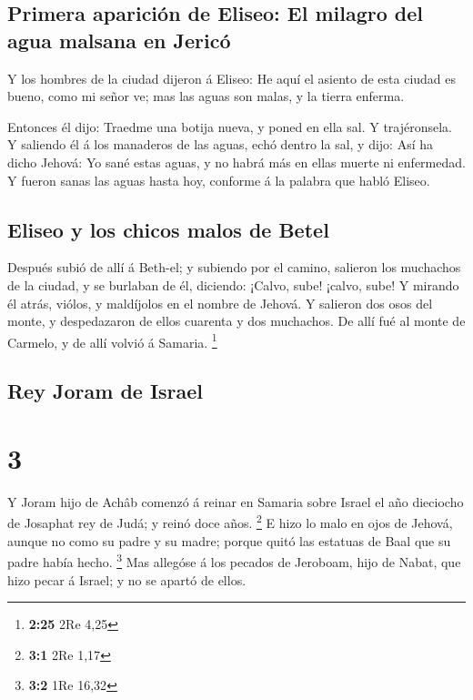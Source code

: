 \hypertarget{primera-apariciuxf3n-de-eliseo-el-milagro-del-agua-malsana-en-jericuxf3}{%
\subsection{Primera aparición de Eliseo: El milagro del agua malsana en
Jericó}\label{primera-apariciuxf3n-de-eliseo-el-milagro-del-agua-malsana-en-jericuxf3}}

 Y los hombres de la ciudad dijeron á Eliseo: He aquí el
asiento de esta ciudad es bueno, como mi señor ve; mas las aguas son
malas, y la tierra enferma.

 Entonces él dijo: Traedme una botija nueva, y poned en
ella sal. Y trajéronsela.  Y saliendo él á los manaderos
de las aguas, echó dentro la sal, y dijo: Así ha dicho Jehová: Yo sané
estas aguas, y no habrá más en ellas muerte ni enfermedad.
 Y fueron sanas las aguas hasta hoy, conforme á la
palabra que habló Eliseo.

\hypertarget{eliseo-y-los-chicos-malos-de-betel}{%
\subsection{Eliseo y los chicos malos de
Betel}\label{eliseo-y-los-chicos-malos-de-betel}}

 Después subió de allí á Beth-el; y subiendo por el
camino, salieron los muchachos de la ciudad, y se burlaban de él,
diciendo: ¡Calvo, sube! ¡calvo, sube!  Y mirando él
atrás, viólos, y maldíjolos en el nombre de Jehová. Y salieron dos osos
del monte, y despedazaron de ellos cuarenta y dos muchachos.
 De allí fué al monte de Carmelo, y de allí volvió á
Samaria. \footnote{\textbf{2:25} 2Re 4,25}

\hypertarget{rey-joram-de-israel}{%
\subsection{Rey Joram de Israel}\label{rey-joram-de-israel}}

\hypertarget{section-2}{%
\section{3}\label{section-2}}

 Y Joram hijo de Achâb comenzó á reinar en Samaria sobre
Israel el año dieciocho de Josaphat rey de Judá; y reinó doce años.
\footnote{\textbf{3:1} 2Re 1,17}  E hizo lo malo en ojos
de Jehová, aunque no como su padre y su madre; porque quitó las estatuas
de Baal que su padre había hecho. \footnote{\textbf{3:2} 1Re 16,32}
 Mas allegóse á los pecados de Jeroboam, hijo de Nabat,
que hizo pecar á Israel; y no se apartó de ellos.

